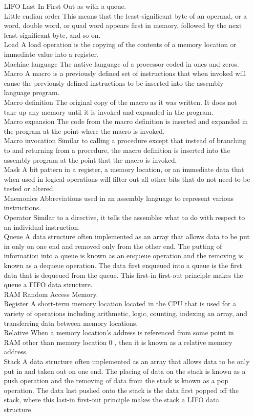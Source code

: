 \documentclass[10pt]{book}
\begin{document}
LIFO Last In First Out as with a queue.\\
Little endian order This means that the least-significant byte of an operand, or a word, double word, or quad word appears first in memory, followed by the next least-significant byte, and so on.\\
Load A load operation is the copying of the contents of a memory location or immediate value into a register.\\
Machine language The native language of a processor coded in ones and zeros. Macro A macro is a previously defined set of instructions that when invoked will cause the previously defined instructions to be inserted into the assembly language program.\\
Macro definition The original copy of the macro as it was written. It does not take up any memory until it is invoked and expanded in the program.\\
Macro expansion The code from the macro definition is inserted and expanded in the program at the point where the macro is invoked.\\
Macro invocation Similar to calling a procedure except that instead of branching to and returning from a procedure, the macro definition is inserted into the assembly program at the point that the macro is invoked.\\
Mask A bit pattern in a register, a memory location, or an immediate data that when used in logical operations will filter out all other bits that do not need to be tested or altered.\\
Mnemonics Abbreviations used in an assembly language to represent various instructions.\\
Operator Similar to a directive, it tells the assembler what to do with respect to an individual instruction.\\
Queue A data structure often implemented as an array that allows data to be put in only on one end and removed only from the other end. The putting of information into a queue is known as an enqueue operation and the removing is known as a dequeue operation. The data first enqueued into a queue is the first data that is dequeued from the queue. This first-in first-out principle makes the queue a FIFO data structure.\\
RAM Random Access Memory.\\
Register A short-term memory location located in the CPU that is used for a variety of operations including arithmetic, logic, counting, indexing an array, and transferring data between memory locations.\\
Relative When a memory location's address is referenced from some point in RAM other than memory location 0 , then it is known as a relative memory address.\\
Stack A data structure often implemented as an array that allows data to be only put in and taken out on one end. The placing of data on the stack is known as a push operation and the removing of data from the stack is known as a pop operation. The data last pushed onto the stack is the data first popped off the stack, where this last-in first-out principle makes the stack a LIFO data structure.
\end{document}
